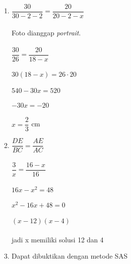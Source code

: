 \documentclass[12pt,a4paper]{article}
\begin{document}
\begin{enumerate}
		\item $\dfrac{30}{30-2-2}=\dfrac{20}{20-2-x}$\\
		\\
		 Foto dianggap \textit{portrait}. \\ 
		 \\
		$\dfrac{30}{26}=\dfrac{20}{18-x}$\\
		\\
		$30(18-x)=26\cdot 20$\\
		\\
		$540-30x=520$\\
		\\
		$-30x=-20$\\
		\\
		$x=\dfrac{2}{3}$ cm
		\item $\dfrac{DE}{BC}=\dfrac{AE}{AC}$\\
		\\
		$\dfrac{3}{x}=\dfrac{16-x}{16}$\\
		\\
		$16x-x^2=48$\\
		\\
		$x^2-16x+48=0$\\
		\\
		$(x-12)(x-4)$\\
		\\
		jadi x memiliki solusi 12 dan 4
		\item Dapat dibuktikan dengan metode SAS
	\end{enumerate}
	
\end{document}
